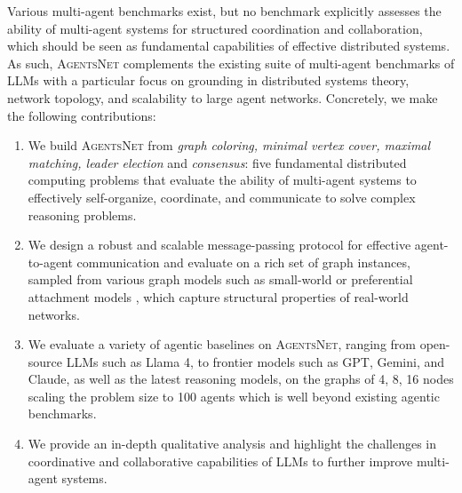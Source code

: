 \documentclass{article}
\newcommand{\benchmark}{\textsc{AgentsNet}}
\begin{document}
Various multi-agent benchmarks exist, but no benchmark explicitly assesses the ability of multi-agent systems for structured coordination and collaboration, which should be seen as fundamental capabilities of effective distributed systems. As such, \benchmark{} complements the existing suite of multi-agent benchmarks of LLMs with a particular focus on grounding in distributed systems theory, network topology, and scalability to large agent networks. Concretely, we make the following contributions:
\begin{enumerate}
    \item We build \benchmark{} from \textit{graph coloring, minimal vertex cover, maximal matching, leader election}  and \textit{consensus}: five fundamental distributed computing problems that evaluate the ability of multi-agent systems to effectively self-organize, coordinate, and communicate to solve complex reasoning problems.
    \item We design a robust and scalable message-passing protocol for effective agent-to-agent communication and evaluate on a rich set of graph instances, sampled from various graph models such as small-world \citep{watts1998collective} or preferential attachment models \citep{barabasi1999emergence}, which capture structural properties of real-world networks.
    \item We evaluate a variety of agentic baselines on \benchmark{}, ranging from open-source LLMs such as Llama 4, to frontier models such as GPT, Gemini, and Claude, as well as the latest reasoning models, on the graphs of 4, 8, 16 nodes scaling the problem size to 100 agents which is well beyond existing agentic benchmarks.
    \item We provide an in-depth qualitative analysis and highlight the challenges in coordinative and collaborative capabilities of LLMs 
    to further improve multi-agent systems.
\end{enumerate}
\end{document}
